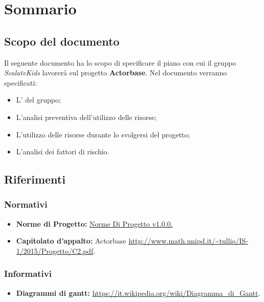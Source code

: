 \documentclass{scalatekids-article}
\begin{document}
\tableofcontents
\newpage
{}
\section{Sommario}
\subsection{Scopo del documento}
Il seguente documento ha lo scopo di specificare il piano con cui il gruppo \textit{ScalateKids} lavorerà sul progetto \textbf{Actorbase}.
Nel documento verranno specificati:
\begin{itemize}
\item {L' del gruppo;}
\item {L'analisi preventiva dell'utilizzo delle risorse;}
\item {L'utilizzo delle risorse durante lo svolgersi del progetto;}
\item {L'analisi dei fattori di rischio.}
\end{itemize}
\prodPurpose
\glossExpl
\subsection{Riferimenti}
\subsubsection{Normativi}
\begin{itemize}
	\item \textbf{Norme di Progetto:} \href{run:../Interni/NormeDiProgetto\_v1.0.0.pdf}{Norme Di Progetto v1.0.0.}
	\item \textbf{Capitolato d'appalto:} Actorbase \url{http://www.math.unipd.it/~tullio/IS-1/2015/Progetto/C2.pdf}.
\end{itemize}
\subsubsection{Informativi}
\begin{itemize}
	\item \textbf{Diagrammi di gantt:} \url{https://it.wikipedia.org/wiki/Diagramma_di_Gantt}.
\end{itemize}
\end{document}
